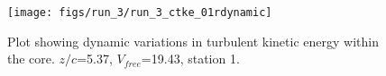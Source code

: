 \begin{figure}[H]
\centering
\texttt{[image: figs/run\_3/run\_3\_ctke\_01rdynamic]}
\caption{Plot showing dynamic variations in turbulent kinetic energy within the core. $z/c$=5.37, $V_{free}$=19.43, station 1.}
\label{fig:run_3_ctke_01rdynamic}
\end{figure}


